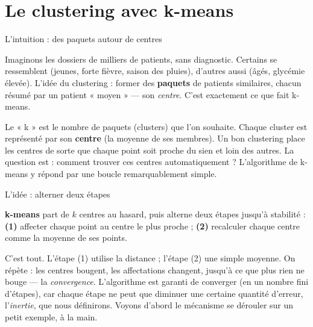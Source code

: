 \documentclass[aspectratio=169,11pt]{beamer}
\begin{document}
\section{Le clustering avec k-means}

\begin{frame}{L'intuition : des paquets autour de centres}
\begin{ucadfront}
{\small Imaginons les dossiers de milliers de patients, sans diagnostic. Certains se ressemblent (jeunes, forte fièvre, saison des pluies), d'autres aussi (âgés, glycémie élevée). L'idée du clustering : former des \textbf{paquets} de patients similaires, chacun résumé par un patient « moyen » — son \emph{centre}. C'est exactement ce que fait k-means.}
\end{ucadfront}
{\small Le « k » est le nombre de paquets (clusters) que l'on souhaite. Chaque cluster est représenté par son \textbf{centre} (la moyenne de ses membres). Un bon clustering place les centres de sorte que chaque point soit proche du sien et loin des autres. La question est : comment trouver ces centres automatiquement ? L'algorithme de k-means y répond par une boucle remarquablement simple.}
\end{frame}

\begin{frame}{L'idée : alterner deux étapes}
\begin{ucaddef}
{\small \textbf{k-means} part de $k$ centres au hasard, puis alterne deux étapes jusqu'à stabilité : \textbf{(1)} affecter chaque point au centre le plus proche ; \textbf{(2)} recalculer chaque centre comme la moyenne de ses points.}
\end{ucaddef}
{\small C'est tout. L'étape (1) utilise la distance ; l'étape (2) une simple moyenne. On répète : les centres bougent, les affectations changent, jusqu'à ce que plus rien ne bouge — la \emph{convergence}. L'algorithme est garanti de converger (en un nombre fini d'étapes), car chaque étape ne peut que diminuer une certaine quantité d'erreur, l'\emph{inertie}, que nous définirons. Voyons d'abord le mécanisme se dérouler sur un petit exemple, à la main.}
\end{frame}
\end{document}
